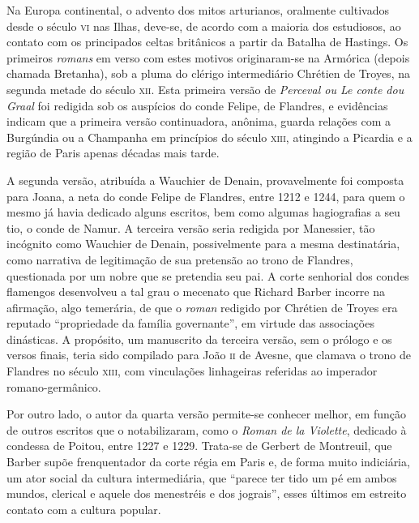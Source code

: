 Na Europa continental, o advento dos mitos arturianos, oralmente
cultivados desde o século \textsc{vi} nas Ilhas, deve-se, de acordo com a
maioria dos estudiosos, ao contato com os principados celtas britânicos
a partir da Batalha de Hastings. Os primeiros \textit{romans} em verso
com estes motivos originaram-se na Armórica (depois chamada Bretanha),
sob a pluma do clérigo intermediário Chrétien de Troyes, na segunda
metade do século \textsc{xii}. Esta primeira versão de \textit{Perceval ou Le
conte dou Graal} foi redigida sob os auspícios do conde Felipe, de
Flandres, e evidências indicam que a primeira versão continuadora,
anônima, guarda relações com a Burgúndia ou a Champanha em princípios
do século \textsc{xiii}, atingindo a Picardia e a região de Paris apenas décadas
mais tarde. 

A segunda versão, atribuída a Wauchier de Denain, provavelmente foi
composta para Joana, a neta do conde Felipe de Flandres, entre 1212 e
1244, para quem o mesmo já havia dedicado alguns escritos, bem como
algumas hagiografias a seu tio, o conde de Namur. A terceira versão
seria redigida por Manessier, tão incógnito como Wauchier de Denain,
possivelmente para a mesma destinatária, como narrativa de legitimação
de sua pretensão ao trono de Flandres, questionada por um nobre que se
pretendia seu pai. A corte senhorial dos condes flamengos desenvolveu a
tal grau o mecenato que Richard Barber incorre na afirmação, algo
temerária, de que o \textit{roman} redigido por Chrétien de Troyes era
reputado “propriedade da família governante”, em virtude das
associações dinásticas. A propósito, um manuscrito da terceira versão,
sem o prólogo e os versos finais, teria sido compilado para João \textsc{ii} de
Avesne, que clamava o trono de Flandres no século \textsc{xiii}, com vinculações
linhageiras referidas ao imperador romano-germânico.

Por outro lado, o autor da quarta versão permite-se conhecer melhor, em
função de outros escritos que o notabilizaram, como o \textit{Roman de
la Violette}, dedicado à condessa de Poitou, entre 1227 e 1229.
Trata-se de Gerbert de Montreuil, que Barber supõe frenquentador da
corte régia em Paris e, de forma muito indiciária, um ator social da
cultura intermediária, que “parece ter tido um pé em ambos mundos,
clerical e aquele dos menestréis e dos jograis”, esses últimos em
estreito contato com a cultura popular. 

